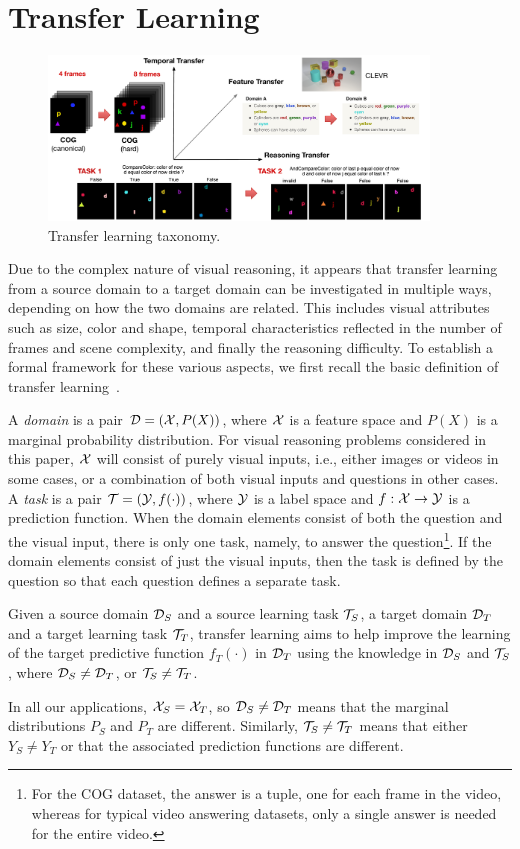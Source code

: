 \section{Transfer Learning}
\label{sec:transfer_learning}
\begin{figure}
	\centering
	\includegraphics[width=0.9\textwidth]{../img/architecture/transfer_taxo}
	\caption{Transfer learning taxonomy.}\label{fig:taskonomy}
\end{figure}
Due to the complex nature of visual reasoning, it appears that
transfer learning from a source domain to a target domain can be investigated in
multiple ways, depending on how the two domains are related. This includes visual attributes such as size, color and shape, temporal characteristics reflected in the number of frames and scene complexity, and finally the reasoning difficulty. 
To establish a formal framework for these various aspects, we first recall the basic definition of transfer learning~\cite{pan2009survey}.

A \emph{domain} is a pair $\mathcal{D} = (\mathcal{X},P(X))$, where $\mathcal{X}$ is a feature space and $P(X)$ is a marginal probability distribution.
For visual reasoning problems considered in this paper,
$\mathcal{X}$ will consist of purely visual inputs, i.e., either images or videos in some cases, or
a combination of both visual inputs and questions in other cases.
A \emph{task} is a pair $\mathcal{T}= (\mathcal{Y},f(\cdot))$, where $\mathcal{Y}$ is a label space and $f: \mathcal{X} \to \mathcal{Y}$ is a prediction function.
When the domain elements consist of both the question and the visual input, there is only one task, namely, to answer the
question\footnote{%
	For the COG dataset, the answer is a tuple, one for each frame in the video, whereas for typical video answering datasets,
	only a single answer is needed for the entire video.}. %
If the domain elements consist of just the visual inputs, then the task is defined by the question so that each question
defines a separate task.

\begin{definition}
	\label{defn:transfer}
	Given a source domain $\mathcal{D}_S$ and a source learning task $\mathcal{T}_S$, a target domain $\mathcal{D}_T$ and a target learning task $\mathcal{T}_T$, transfer learning aims to help improve the
	learning of the target predictive function $f_T(\cdot)$ in $\mathcal{D}_T$ using the knowledge  in $\mathcal{D}_S$ and $\mathcal{T}_S$, where $\mathcal{D}_S \ne \mathcal{D}_T$, or $\mathcal{T}_S \ne \mathcal{T}_T$.
\end{definition}
In all our applications, $\mathcal{X}_S = \mathcal{X}_T$, so $\mathcal{D}_S \ne \mathcal{D}_T$ means that the marginal distributions $P_S$ and $P_T$ are different.
Similarly, $\mathcal{T}_S \ne \mathcal{T}_T$ means that either $Y_S \ne Y_T$ or that the associated prediction functions are different.

